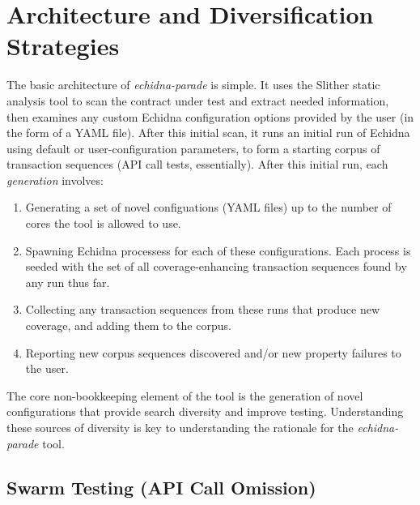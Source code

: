 \documentclass[sigconf]{acmart}
\begin{document}
{\section{Architecture and Diversification Strategies}

The basic architecture of \emph{echidna-parade} is simple.  It uses
the Slither static analysis tool to scan the contract under test and
extract needed information, then examines any custom Echidna
configuration options provided by the user (in the form of a YAML
file).  After this initial scan, it runs an initial run of Echidna
using default or user-configuration parameters, to form a starting
corpus of transaction sequences (API call tests, essentially).  After
this initial run, each \emph{generation} involves:

\begin{enumerate}
  \item Generating a set of novel configuations (YAML files) up to the
    number of cores the tool is allowed to use. 
    \item Spawning Echidna processess for each of these
      configurations.  Each process is seeded with the set of all
      coverage-enhancing transaction sequences found by any run thus far.
      \item Collecting any transaction sequences from these runs that
        produce new coverage, and adding them to the corpus.
        \item Reporting new corpus sequences discovered and/or new property failures to
          the user.
        \end{enumerate}

The core non-bookkeeping element of the tool is the generation of
novel configurations that provide search diversity and improve
testing.  Understanding these sources of diversity is key to
understanding the rationale for the \emph{echidna-parade} tool.

\subsection{Swarm Testing (API Call Omission)}

}
\end{document}
